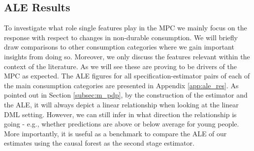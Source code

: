 \subsection{ALE Results} \label{subsec:ale_res}
To investigate what role single features play in the MPC we mainly focus on the response with respect to changes in non-durable consumption. We will briefly draw comparisons to other consumption categories where we gain important insights from doing so. Moreover, we only discuss the features relevant within the context of the literature. As we will see these are proving to be drivers of the MPC as expected. The ALE figures for all specification-estimator pairs of each of the main consumption categories are presented in Appendix \ref{app:ale_res}. As pointed out in Section \ref{subsec:m_pdp}, by the construction of the estimator and the ALE, it will always depict a linear relationship when looking at the linear DML setting. However, we can still infer in what direction the relationship is going - e.g., whether predictions are above or below average for young people. More importantly, it is useful as a benchmark to compare the ALE of our estimates using the causal forest as the second stage estimator. \\
